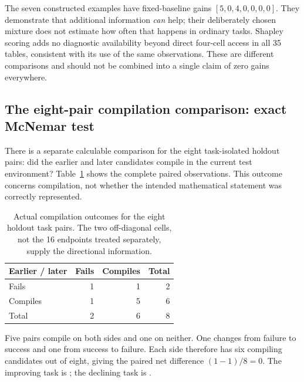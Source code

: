 The seven constructed examples have fixed-baseline gains $[5,0,4,0,0,0,0]$. They demonstrate that additional information \emph{can} help; their deliberately chosen mixture does not estimate how often that happens in ordinary tasks. Shapley scoring adds no diagnostic availability beyond direct four-cell access in all 35 tables, consistent with its use of the same observations. These are different comparisons and should not be combined into a single claim of zero gains everywhere.

\subsection{The eight-pair compilation comparison: exact McNemar test}
\label{subsec:mcnemar}
There is a separate calculable comparison for the eight task-isolated holdout pairs: did the earlier and later candidates compile in the current test environment? Table~\ref{tab:compile-pairs} shows the complete paired observations. This outcome concerns compilation, not whether the intended mathematical statement was correctly represented.

\begin{table}[htbp]
\centering\small
\caption{Actual compilation outcomes for the eight holdout task pairs. The two off-diagonal cells, not the 16 endpoints treated separately, supply the directional information.}
\label{tab:compile-pairs}
\begin{tabular}{lrrr}
\toprule
Earlier / later & Fails & Compiles & Total \\
\midrule
Fails & 1 & 1 & 2 \\
Compiles & 1 & 5 & 6 \\
\midrule
Total & 2 & 6 & 8 \\
\bottomrule
\end{tabular}
\end{table}

Five pairs compile on both sides and one on neither. One changes from failure to success and one from success to failure. Each side therefore has six compiling candidates out of eight, giving the paired net difference $(1-1)/8=0$. The improving task is ; the declining task is .

